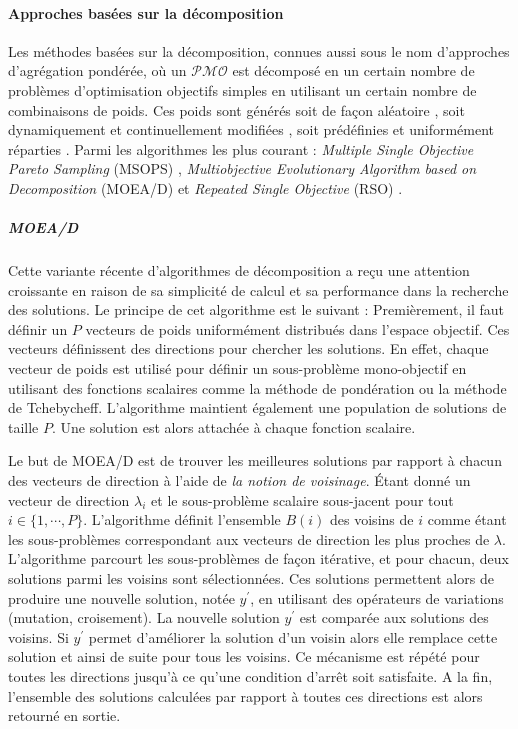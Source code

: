 \paragraph{Approches basées sur la décomposition}
Les méthodes basées sur la décomposition, connues aussi sous le nom d'approches d'agrégation pondérée, où un $\mathcal{PMO}$ est décomposé en un certain nombre de problèmes d'optimisation objectifs simples en utilisant un certain nombre de combinaisons de poids. Ces poids sont générés  soit de façon aléatoire \cite{Ishibuchi98}, soit dynamiquement et continuellement modifiées \cite{Jin01}, soit prédéfinies et uniformément réparties \cite{Murata01}. Parmi les algorithmes les plus courant : \textit{Multiple Single Objective Pareto Sampling} (MSOPS) \cite{Hughes03}, \textit{Multiobjective Evolutionary Algorithm based on Decomposition} (MOEA/D) \cite{Zhang07} et \textit{Repeated Single Objective} (RSO) \cite{Hughes05}.

\subparagraph{MOEA/D}
Cette variante récente d'algorithmes de décomposition a reçu une attention croissante en raison de sa simplicité de calcul et sa performance dans la recherche des solutions.
Le principe de cet algorithme est le suivant : Premièrement, il faut définir un $P$ vecteurs de poids uniformément distribués dans l’espace objectif. Ces vecteurs définissent des directions pour chercher les solutions. En effet, chaque vecteur de poids est utilisé pour définir un sous-problème mono-objectif en utilisant des fonctions scalaires comme la méthode de pondération ou la méthode de Tchebycheff. L’algorithme maintient également une population de solutions de taille $P$. Une solution est alors attachée à chaque fonction scalaire.

Le but de MOEA/D est de trouver les meilleures solutions par rapport à chacun des vecteurs de direction à l'aide de \textit{la notion de voisinage}. Étant donné un vecteur de direction $\lambda_i$ et le sous-problème scalaire sous-jacent pour tout $i \in \{1, \cdots, P\}$. L'algorithme définit l’ensemble $B(i)$ des voisins de $i$ comme étant les sous-problèmes correspondant aux vecteurs de direction les plus proches de $\lambda$. L’algorithme parcourt les sous-problèmes de façon itérative, et pour chacun, deux solutions parmi les voisins sont sélectionnées. Ces solutions permettent alors de produire une nouvelle solution, notée $y^\prime$, en utilisant des opérateurs de variations (mutation, croisement). La nouvelle solution $y^\prime$ est comparée aux solutions des voisins. Si $y^\prime$ permet d’améliorer la solution d’un voisin alors elle remplace cette solution et ainsi de suite pour tous les voisins. Ce mécanisme est répété pour toutes les directions jusqu’à ce qu’une condition d’arrêt soit satisfaite. A la fin, l’ensemble des solutions calculées par rapport à toutes ces directions est alors retourné en sortie.

